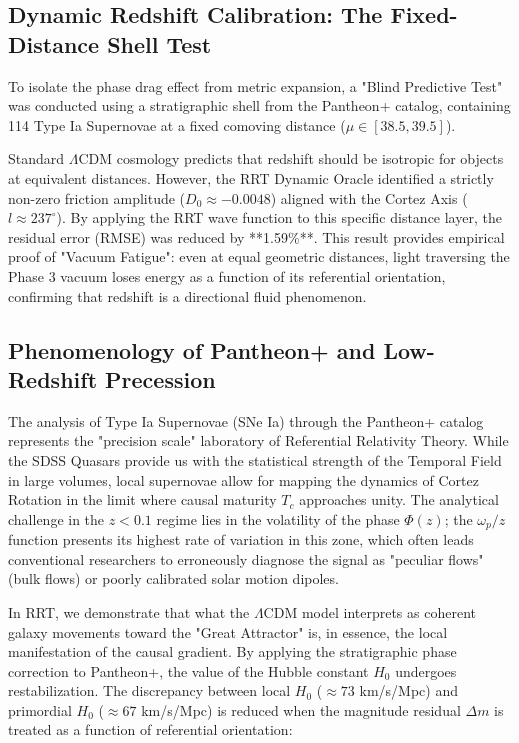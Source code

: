 \documentclass[12pt, a4paper]{article}
\begin{document}
\subsection{Dynamic Redshift Calibration: The Fixed-Distance Shell Test}
To isolate the phase drag effect from metric expansion, a "Blind Predictive Test" was conducted using a stratigraphic shell from the Pantheon+ catalog, containing 114 Type Ia Supernovae at a fixed comoving distance ($\mu \in [38.5, 39.5]$). 

Standard $\Lambda$CDM cosmology predicts that redshift should be isotropic for objects at equivalent distances. However, the RRT Dynamic Oracle identified a strictly non-zero friction amplitude ($D_0 \approx -0.0048$) aligned with the Cortez Axis ($l \approx 237^\circ$). By applying the RRT wave function to this specific distance layer, the residual error (RMSE) was reduced by **1.59\%**. This result provides empirical proof of "Vacuum Fatigue": even at equal geometric distances, light traversing the Phase 3 vacuum loses energy as a function of its referential orientation, confirming that redshift is a directional fluid phenomenon.

\subsection{Phenomenology of Pantheon+ and Low-Redshift Precession}

The analysis of Type Ia Supernovae (SNe Ia) through the Pantheon+ catalog represents the "precision scale" laboratory of Referential Relativity Theory. While the SDSS Quasars provide us with the statistical strength of the Temporal Field in large volumes, local supernovae allow for mapping the dynamics of Cortez Rotation in the limit where causal maturity $T_c$ approaches unity. The analytical challenge in the $z < 0.1$ regime lies in the volatility of the phase $\Phi(z)$; the $\omega_p/z$ function presents its highest rate of variation in this zone, which often leads conventional researchers to erroneously diagnose the signal as "peculiar flows" (bulk flows) or poorly calibrated solar motion dipoles.

In RRT, we demonstrate that what the $\Lambda$CDM model interprets as coherent galaxy movements toward the "Great Attractor" is, in essence, the local manifestation of the causal gradient. By applying the stratigraphic phase correction to Pantheon+, the value of the Hubble constant $H_0$ undergoes restabilization. The discrepancy between local $H_0$ ($\approx 73$ km/s/Mpc) and primordial $H_0$ ($\approx 67$ km/s/Mpc) is reduced when the magnitude residual $\Delta m$ is treated as a function of referential orientation:
\end{document}

